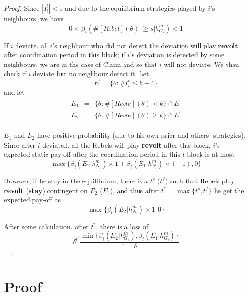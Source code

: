 \documentclass[12pt]{article}
\theoremstyle{remark}
\theoremstyle{remark}
\begin{document}
\begin{proof}
Since $|I^t_i|<s$ and due to the equilibrium strategies played by $i$'s neighbours, we have 
\[0<\beta_{i}(\#[Rebel](\theta)|\geq s|h^{m}_{G_i})<1\]

If $i$ deviate, all $i$'s neighbour who did not detect the deviation will play $\textbf{revolt}$ after coordination period in this block; if $i$'s deviation is detected by some neighbours, we are in the case of Claim and so that $i$ will not deviate. We then check if $i$ deviate but no neighbour detect it.
Let 
\[E^{'}=\{\theta:\#I^{t}_i\leq k-1\}\]
and let 
\begin{eqnarray*}
E_1&=&\{\theta: \#[Reble](\theta)<k\}\cap E^{'}\\
E_2&=&\{\theta: \#[Reble](\theta)\geq k\}\cap E^{'}\\
\end{eqnarray*}

$E_1$ and $E_2$ have positive probability (due to his own prior and others' strategies). Since after $i$ deviated, all the Rebels will play \textbf{revolt} after this block, $i$'s expected static pay-off after the coordination period in this $t$-block is at most 
\[
{\max\{\beta_{i}(E_2|h^{m}_{N_i})\times 1+\beta_{i}(E_1|h^{m}_{N_i})\times (-1), 0\}}
\]

However, if he stay in the equilibrium, there is a $t^s$ ($t^f$) such that Rebels play \textbf{revolt} (\textbf{stay}) contingent on $E_2$ ($E_1$), and thus after $t^*=\max\{t^s,t^f\}$ he get the expected pay-off as
\[
{\max\{\beta_{i}(E_2|h^{m}_{N_i})\times 1, 0\}}
\]

After some calculation, after $t^*$, there is a loss of
\[\delta^{t^{*}}\frac{\min\{\beta_{i}(E_2|h^{m}_{G_i}),\beta_{i}(E_1|h^{m}_{G_i})\}}{1-\delta}\]

\end{proof}







\appendix
\section{Proof}
\end{document}

